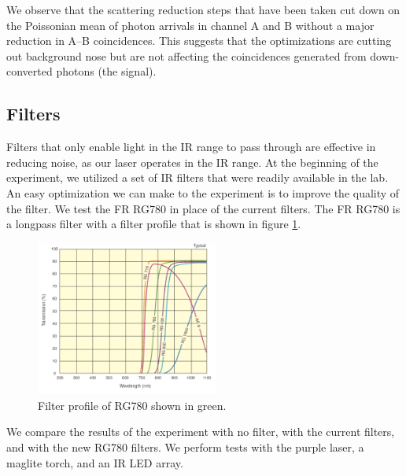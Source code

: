 \documentclass[letterpaper, 11 pt]{article}
\begin{document}
We observe that the scattering reduction steps that have been taken cut down on
the Poissonian mean of photon arrivals in channel A and B without a major
reduction in A--B coincidences. This suggests that the optimizations are cutting
out background nose but are not affecting the coincidences generated from
down-converted photons (the signal). 

\subsection{Filters}

Filters that only enable light in the IR range to pass through are effective in
reducing noise, as our laser operates in the IR range. At the beginning of the
experiment, we utilized a set of IR filters that were readily available in the lab. An easy optimization we can
make to the experiment is to improve the quality of the filter. We test the FR
RG780 in place of the current filters. The FR RG780 is a longpass filter with a filter
profile that is shown in figure \ref{fig:filter_prof}.
\begin{figure}[H]
    \centering
    \includegraphics[width = 6cm]{COLOR_FILT_XMIT_8_600w.png}
    \caption{Filter profile of RG780 shown in green.}
    \label{fig:filter_prof}
\end{figure}

We compare the results of the experiment with no filter, with the current filters,
and with the new RG780 filters. We perform tests with the purple laser, a
maglite torch, and an IR LED array.
\end{document}
